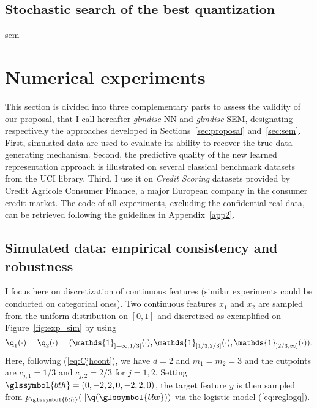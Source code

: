 \subsection{Stochastic search of the best quantization} \label{subsec:stoch}

\gls{sem}




\section{Numerical experiments} \label{sec:experiments}

This section is divided into three complementary parts to assess the validity of our proposal, that I call hereafter \textit{glmdisc}-NN and \textit{glmdisc}-SEM, designating respectively the approaches developed in Sections~\ref{sec:proposal} and~\ref{sec:sem}. First, simulated data are used to evaluate its ability to recover the true data generating mechanism. Second, the predictive quality of the new learned representation approach is illustrated on several classical benchmark datasets from the UCI library. Third, I use it on \textit{Credit Scoring} datasets provided by Credit Agricole Consumer Finance, a major European company in the consumer credit market. The code of all experiments, excluding the confidential real data, can be retrieved following the guidelines in Appendix~\ref{app2}.


\subsection{Simulated data: empirical consistency and robustness}

I focus here on discretization of continuous features (similar experiments could be conducted on categorical ones). Two continuous features $x_1$ and $x_2$ are sampled from the uniform distribution on $[0,1]$ and discretized as exemplified on Figure~\ref{fig:exp_sim} by using
\[\q_1(\cdot)=\q_2(\cdot) = (\mathds{1}_{]-\infty,1/3]}(\cdot),\mathds{1}_{]1/3,2/3]}(\cdot),\mathds{1}_{]2/3,\infty]}(\cdot)).\]
Here, following (\ref{eq:Cjhcont}), we have $d=2$ and $m_1=m_2=3$ and the cutpoints are $c_{j,1}=1/3$ and $c_{j,2}=2/3$ for $j=1,2$. Setting $\glssymbol{bth}=(0,-2,2,0,-2,2,0)$, the target feature $y$ is then sampled from $p_{\glssymbol{bth}}(\cdot | \q(\glssymbol{bbx}))$ via the logistic model (\ref{eq:reglogq}).

